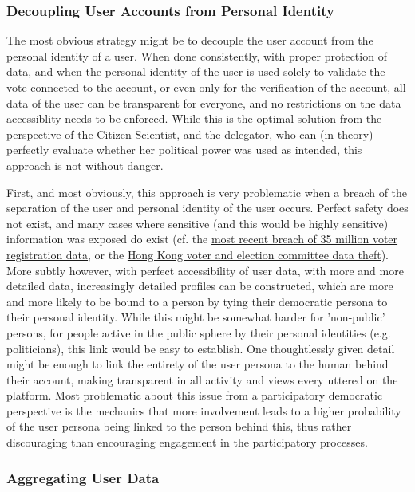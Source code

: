 \subsubsection{Decoupling User Accounts from Personal Identity}

The most obvious strategy might be to decouple the user account from the personal identity of a user. When done consistently, with proper protection of data, and when the personal identity of the user is used solely to validate the vote connected to the account, or even only for the verification of the account, all data of the user can be transparent for everyone, and no restrictions on the data accessiblity needs to be enforced. While this is the optimal solution from the perspective of the Citizen Scientist, and the delegator, who can (in theory) perfectly evaluate whether her political power was used as intended, this approach is not without danger.

First, and most obviously, this approach is very problematic when a breach of the separation of the user and personal identity of the user occurs. Perfect safety does not exist, and many cases where sensitive (and this would be highly sensitive) information was exposed do exist (cf. the \href{https://www.msspalert.com/cybersecurity-markets/americas/voter-registrations-stolen/}{most recent breach of 35 million voter registration data}, or the \href{https://www.scmp.com/news/hong-kong/politics/article/2082566/laptops-containing-37-million-hong-kong-voters-data-stolen}{Hong Kong voter and election committee data theft}). More subtly however, with perfect accessibility of user data, with more and more detailed data, increasingly detailed profiles can be constructed, which are more and more likely to be bound to a person by tying their democratic persona to their personal identity. While this might be somewhat harder for 'non-public' persons, for people active in the public sphere by their personal identities (e.g. politicians), this link would be easy to establish. One thoughtlessly given detail might be enough to link the entirety of the user persona to the human behind their account, making transparent in all activity and views every uttered on the platform. 
Most problematic about this issue from a participatory democratic perspective is the mechanics that more involvement leads to a higher probability of the user persona being linked to the person behind this, thus rather discouraging than encouraging engagement in the participatory processes.

\subsubsection{Aggregating User Data}

